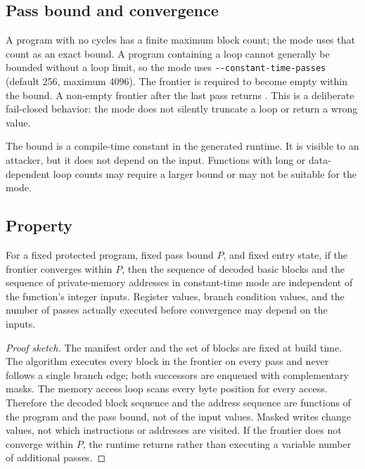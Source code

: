 \subsection{Pass bound and convergence}

A program with no cycles has a finite maximum block count; the mode uses that
count as an exact bound. A program containing a loop cannot generally be bounded
without a loop limit, so the mode uses \verb|--constant-time-passes| (default
256, maximum 4096). The frontier is required to become empty within the bound. A
non-empty frontier after the last pass returns . This is a
deliberate fail-closed behavior: the mode does not silently truncate a loop or
return a wrong value.

The bound is a compile-time constant in the generated runtime. It is visible to
an attacker, but it does not depend on the input. Functions with long or
data-dependent loop counts may require a larger bound or may not be suitable for
the mode.

\subsection{Property}

\begin{proposition}
For a fixed protected program, fixed pass bound $P$, and fixed entry state, if
the frontier converges within $P$, then the sequence of decoded basic blocks and
the sequence of private-memory addresses in constant-time mode are independent of
the function's integer inputs. Register values, branch condition values, and the
number of passes actually executed before convergence may depend on the inputs.
\end{proposition}

\begin{proof}[Proof sketch]
The manifest order and the set of blocks are fixed at build time. The algorithm
executes every block in the frontier on every pass and never follows a single
branch edge; both successors are enqueued with complementary masks. The memory
access loop scans every byte position for every access. Therefore the decoded
block sequence and the address sequence are functions of the program and the pass
bound, not of the input values. Masked writes change values, not which
instructions or addresses are visited. If the frontier does not converge within
$P$, the runtime returns  rather than executing a variable number
of additional passes.
\end{proof}

